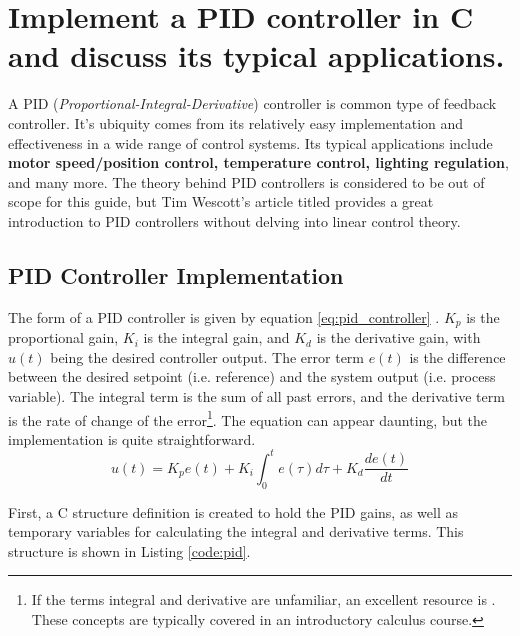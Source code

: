 \documentclass[main.tex]{subfiles}
\begin{document}
\section{Implement a PID controller in C and discuss its typical applications.} \label{section:pid} 

\spoilerline

\noindent A PID (\textit{Proportional-Integral-Derivative}) controller is common type of feedback controller. It's ubiquity comes from its relatively easy implementation and effectiveness in a wide range of control systems. Its typical applications include \textbf{motor speed/position control, temperature control, lighting regulation}, and many more. The theory behind PID controllers is considered to be out of scope for this guide, but Tim Wescott's article titled  provides a great introduction to PID controllers without delving into linear control theory.

\subsection{PID Controller Implementation}
The form of a PID controller is given by equation \eqref{eq:pid_controller} \cite{AbramovitchPID}. $K_p$ is the proportional gain, $K_i$ is the integral gain, and $K_d$ is the derivative gain, with $u(t)$ being the desired controller output. The error term $e(t)$ is the difference between the desired setpoint (i.e. reference) and the system output (i.e. process variable). The integral term is the sum of all past errors, and the derivative term is the rate of change of the error\footnote{If the terms integral and derivative are unfamiliar, an excellent resource is . These concepts are typically covered in an introductory calculus course.}. The equation can appear daunting, but the implementation is quite straightforward.
\begin{equation}
    u(t) = K_p e(t) + K_i \int_{0}^{t} e(\tau) d\tau + K_d \frac{de(t)}{dt}
    \label{eq:pid_controller}
\end{equation}

\noindent First, a C structure definition is created to hold the PID gains, as well as temporary variables for calculating the integral and derivative terms. This structure is shown in Listing \ref{code:pid}.

\end{document}
